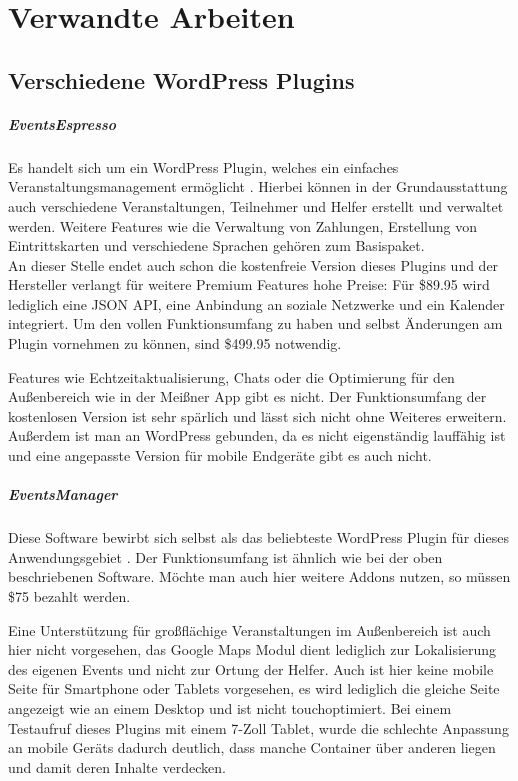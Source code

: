 \chapter{Verwandte Arbeiten}

\section{Verschiedene WordPress Plugins}
\paragraph{EventsEspresso}
Es handelt sich um ein WordPress Plugin, welches ein einfaches Veranstaltungsmanagement ermöglicht \cite{eventespresso}. Hierbei können in der Grundausstattung auch verschiedene Veranstaltungen, Teilnehmer und Helfer erstellt und verwaltet werden. Weitere Features wie die Verwaltung von Zahlungen, Erstellung von Eintrittskarten und verschiedene Sprachen gehören zum Basispaket.\\
An dieser Stelle endet auch schon die kostenfreie Version dieses Plugins und der Hersteller verlangt für weitere Premium Features hohe Preise: Für \$89.95 wird lediglich eine JSON API, eine Anbindung an soziale Netzwerke und ein Kalender integriert. Um den vollen Funktionsumfang zu haben und selbst Änderungen am Plugin vornehmen zu können, sind \$499.95 notwendig.\par

Features wie Echtzeitaktualisierung, Chats oder die Optimierung für den Außenbereich wie in der Meißner App gibt es nicht. Der Funktionsumfang der kostenlosen Version ist sehr spärlich und lässt sich nicht ohne Weiteres erweitern. Außerdem ist man an WordPress gebunden, da es nicht eigenständig lauffähig ist und eine angepasste Version für mobile Endgeräte gibt es auch nicht.

\paragraph{EventsManager}
Diese Software bewirbt sich selbst als das beliebteste WordPress Plugin für dieses Anwendungsgebiet \cite{eventsmanager}. Der Funktionsumfang ist ähnlich wie bei der oben beschriebenen Software. Möchte man auch hier weitere Addons nutzen, so müssen \$75 bezahlt werden.\par

Eine Unterstützung für großflächige Veranstaltungen im Außenbereich ist auch hier nicht vorgesehen, das Google Maps Modul dient lediglich zur Lokalisierung des eigenen Events und nicht zur Ortung der Helfer. Auch ist hier keine mobile Seite für Smartphone oder Tablets vorgesehen, es wird lediglich die gleiche Seite angezeigt wie an einem Desktop und ist nicht touchoptimiert. Bei einem Testaufruf dieses Plugins mit einem 7-Zoll Tablet, wurde die schlechte Anpassung an mobile Geräts dadurch deutlich, dass manche Container über anderen liegen und damit deren Inhalte verdecken.

